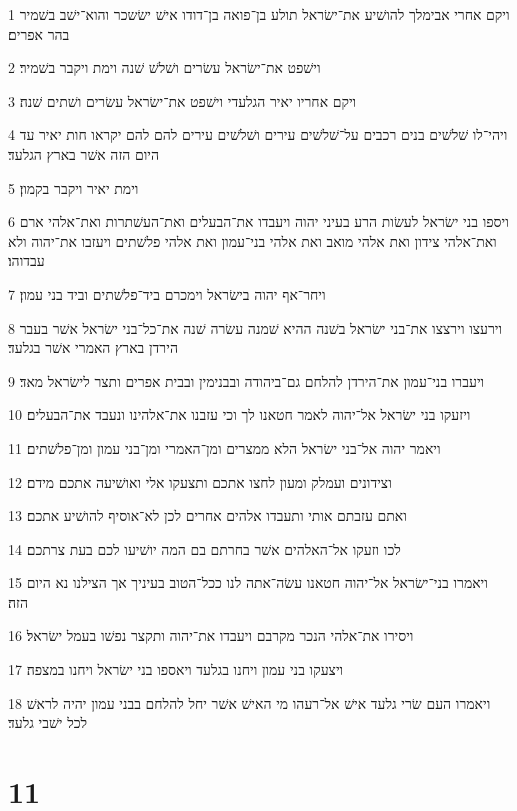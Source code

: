 \par 1 ויקם אחרי אבימלך להושׁיע את־ישׂראל תולע בן־פואה בן־דודו אישׁ ישׂשכר והוא־ישׁב בשׁמיר בהר אפרים׃
\par 2 וישׁפט את־ישׂראל עשׂרים ושׁלשׁ שׁנה וימת ויקבר בשׁמיר׃
\par 3 ויקם אחריו יאיר הגלעדי וישׁפט את־ישׂראל עשׂרים ושׁתים שׁנה׃
\par 4 ויהי־לו שׁלשׁים בנים רכבים על־שׁלשׁים עירים ושׁלשׁים עירים להם להם יקראו חות יאיר עד היום הזה אשׁר בארץ הגלעד׃
\par 5 וימת יאיר ויקבר בקמון׃
\par 6 ויספו בני ישׂראל לעשׂות הרע בעיני יהוה ויעבדו את־הבעלים ואת־העשׁתרות ואת־אלהי ארם ואת־אלהי צידון ואת אלהי מואב ואת אלהי בני־עמון ואת אלהי פלשׁתים ויעזבו את־יהוה ולא עבדוהו׃
\par 7 ויחר־אף יהוה בישׂראל וימכרם ביד־פלשׁתים וביד בני עמון׃
\par 8 וירעצו וירצצו את־בני ישׂראל בשׁנה ההיא שׁמנה עשׂרה שׁנה את־כל־בני ישׂראל אשׁר בעבר הירדן בארץ האמרי אשׁר בגלעד׃
\par 9 ויעברו בני־עמון את־הירדן להלחם גם־ביהודה ובבנימין ובבית אפרים ותצר לישׂראל מאד׃
\par 10 ויזעקו בני ישׂראל אל־יהוה לאמר חטאנו לך וכי עזבנו את־אלהינו ונעבד את־הבעלים׃
\par 11 ויאמר יהוה אל־בני ישׂראל הלא ממצרים ומן־האמרי ומן־בני עמון ומן־פלשׁתים׃
\par 12 וצידונים ועמלק ומעון לחצו אתכם ותצעקו אלי ואושׁיעה אתכם מידם׃
\par 13 ואתם עזבתם אותי ותעבדו אלהים אחרים לכן לא־אוסיף להושׁיע אתכם׃
\par 14 לכו וזעקו אל־האלהים אשׁר בחרתם בם המה יושׁיעו לכם בעת צרתכם׃
\par 15 ויאמרו בני־ישׂראל אל־יהוה חטאנו עשׂה־אתה לנו ככל־הטוב בעיניך אך הצילנו נא היום הזה׃
\par 16 ויסירו את־אלהי הנכר מקרבם ויעבדו את־יהוה ותקצר נפשׁו בעמל ישׂראל׃
\par 17 ויצעקו בני עמון ויחנו בגלעד ויאספו בני ישׂראל ויחנו במצפה׃
\par 18 ויאמרו העם שׂרי גלעד אישׁ אל־רעהו מי האישׁ אשׁר יחל להלחם בבני עמון יהיה לראשׁ לכל ישׁבי גלעד׃

\chapter{11}

